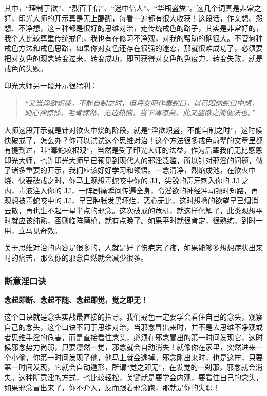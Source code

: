 其中，“理制于欲”、“烈百千倍”、“迷中倍人”、“华瓶盛粪”。这几个词真是非常之好，印光大师的开示真是无上醍醐，每看一遍都有很大收获！这段话，作亲想、怨想、不净想，这三种都是很好的思维对治，走传统戒色的路子，其实是非常好的，我个人比较尊重传统戒色，我也有在修习不净观，对我的帮助的确很大。不管何种戒色方法和戒色思路，如果你对女色还存在很强的迷恋，那就很难成功了，必须要把对女色的观念转变过来，转变成功，即可获得对女色的免疫力，转变失败，就是戒色的失败。

印光大师另一段开示很猛利：

\begin{quote}\it
    “又当淫欲炽盛，不能自制之时，但将女阴作毒蛇口，以己阳纳蛇口中想，则心神惊悸，毛骨悚然，无边热恼，当下清凉矣，此又窒欲之简便法也。”
\end{quote}

大师这段开示就是针对欲火中烧的阶段，就是“淫欲炽盛，不能自制之时”，这时候快破戒了，怎么办？你可以试试这个思维对治！这个方法很多戒色前辈的文章里都有提到过，叫“毒蛇咬根观”，当然是受了印光大师的法益，作为后辈我们无比感恩印光大师，也许印光大师早已预见到现代人的邪淫泛滥，所以针对邪淫的问题，做了诸多重要的开示，我们应该好好学习和领悟。一念清净，烈焰成池，在欲火中烧、快要破戒之时，你马上观想毒蛇咬中你的 JJ，尖锐的毒牙刺入你的 JJ 之内，毒液注入你的 JJ，一阵剧痛瞬间传遍全身，令淫欲的神经冲动顿时短路，再观想被毒蛇咬中的 JJ，早已肿胀发黑坏烂，恶心无比，这时想撸的欲望早已烟消云散，再也生不起一星半点的邪念。这次破戒的危机，就这样化解了，此类观想平时就应该纯熟，否则临阵磨枪，就有点晚了。如果平时就很肯定，很熟练，到时一用，立马见奇效。

关于思维对治的内容是很多的，人就是好了伤疤忘了疼，如果能够多想想症状出来时的痛苦，那么你的邪念自然就会减少很多。

\subsubsection{断意淫口诀}

\begin{center}\bf
    念起即断、念起不随、念起即觉，觉之即无！
\end{center}

这个口诀就是念头实战最直接的指导。我们戒色一定要学会看住自己的念头，观察自己的念头，这个口诀不同于思维对治，当邪念冒出来时，并不是去思维不净观或者思维手淫的危害，而是直接看住念头，必须在邪念冒出的第一时间发现它，这时候邪念势力尚弱，只要凛然一觉，邪念就会自动消失！就像你在家里，突然进来一个小偷，你第一时间发现了他，他马上就会逃掉。邪念刚出来时，也是这样，只要第一时间发现，它就会自动遁形，所谓“觉之即无”，在发觉的一刹那，邪念就会消失。这种断意淫的方式，也比较轻松，关键就是要学会内观，要看住自己的念头，如果邪念冒出来了，你不介入，反而跟着邪念跑，那就是你的失职！


